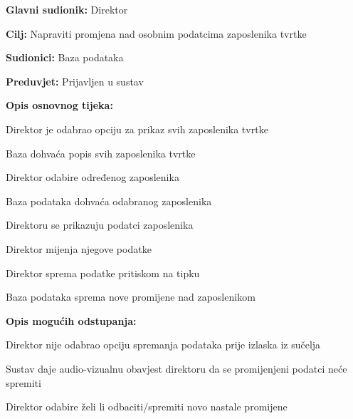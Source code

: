 					
					\noindent {}
					\begin{packed_item}
						
						\item \textbf{Glavni sudionik: }Direktor
						\item  \textbf{Cilj:} Napraviti promjena nad osobnim podatcima zaposlenika tvrtke
						\item  \textbf{Sudionici:} Baza podataka
						\item  \textbf{Preduvjet:} Prijavljen u sustav
						\item  \textbf{Opis osnovnog tijeka:}
						
						\item[] \begin{packed_enum}
							
							\item Direktor je odabrao opciju za prikaz svih zaposlenika tvrtke
							\item Baza dohvaća popis svih zaposlenika tvrtke
							\item Direktor odabire određenog zaposlenika
							\item Baza podataka dohvaća odabranog zaposlenika
							\item Direktoru se prikazuju podatci zaposlenika
							\item Direktor mijenja njegove podatke
							\item Direktor sprema podatke pritiskom na tipku
							\item Baza podataka sprema nove promijene nad zaposlenikom
						 
						\end{packed_enum}
						
						\item  \textbf{Opis mogućih odstupanja:}
						
						\item[] \begin{packed_item}
							
							\item[7.a] Direktor nije odabrao  opciju spremanja podataka prije izlaska iz sučelja
							\item[] \begin{packed_enum}
								
								\item Sustav daje audio-vizualnu obavjest direktoru da se promijenjeni podatci neće spremiti
								\item Direktor odabire želi li odbaciti/spremiti novo nastale promijene
								

\end{packed_enum}
\end{packed_item}
\end{packed_item}
